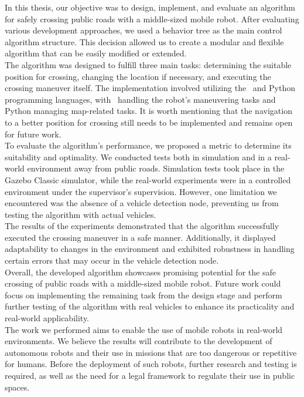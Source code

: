 In this thesis, our objective was to design, implement, and evaluate an algorithm for safely crossing public roads with a middle-sized mobile robot. After evaluating various development approaches, we used a behavior tree as the main control algorithm structure. This decision allowed us to create a modular and flexible algorithm that can be easily modified or extended.\\
The algorithm was designed to fulfill three main tasks: determining the suitable position for crossing, changing the location if necessary, and executing the crossing maneuver itself. The implementation involved utilizing the \CC\ and Python programming languages, with \CC\ handling the robot's maneuvering tasks and Python managing map-related tasks. It is worth mentioning that the navigation to a better position for crossing still needs to be implemented and remains open for future work.\\
To evaluate the algorithm's performance, we proposed a metric to determine its suitability and optimality. We conducted tests both in simulation and in a real-world environment away from public roads. Simulation tests took place in the Gazebo Classic simulator, while the real-world experiments were in a controlled environment under the supervisor's supervision. However, one limitation we encountered was the absence of a vehicle detection node, preventing us from testing the algorithm with actual vehicles.\\
The results of the experiments demonstrated that the algorithm successfully executed the crossing maneuver in a safe manner. Additionally, it displayed adaptability to changes in the environment and exhibited robustness in handling certain errors that may occur in the vehicle detection node.\\
Overall, the developed algorithm showcases promising potential for the safe crossing of public roads with a middle-sized mobile robot. Future work could focus on implementing the remaining task from the design stage and perform further testing of the algorithm with real vehicles to enhance its practicality and real-world applicability.\\
The work we performed aims to enable the use of mobile robots in real-world environments. We believe the results will contribute to the development of autonomous robots and their use in missions that are too dangerous or repetitive for humans. Before the deployment of such robots, further research and testing is required, as well as the need for a legal framework to regulate their use in public spaces.

